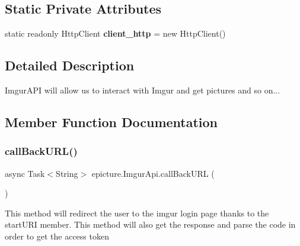 \subsection*{Static Private Attributes}
\begin{DoxyCompactItemize}
\item 
\mbox{\label{classepicture_1_1_imgur_api_a6cfcc3b9ccb8501f08d54a8def210520}} 
static readonly Http\+Client {\bfseries client\+\_\+http} = new Http\+Client()
\end{DoxyCompactItemize}


\subsection{Detailed Description}
Imgur\+A\+PI will allow us to interact with Imgur and get pictures and so on... 

\subsection{Member Function Documentation}
\mbox{\label{classepicture_1_1_imgur_api_a3ddaf3c09b2d5edf39ace0f2390f78a9}} 
\subsubsection{\texorpdfstring{call\+Back\+U\+R\+L()}{callBackURL()}}
{\footnotesize\ttfamily async Task$<$String$>$ epicture.\+Imgur\+Api.\+call\+Back\+U\+RL (\begin{DoxyParamCaption}{ }\end{DoxyParamCaption})}

This method will redirect the user to the imgur login page thanks to the start\+U\+RI member. This method will also get the response and parse the code in order to get the access token \mbox{\label{classepicture_1_1_imgur_api_a105393adc1ac69c9be3fbd9c020c1b57}} 
